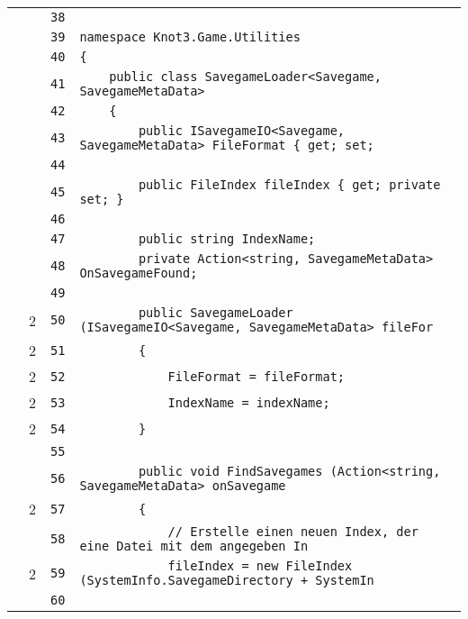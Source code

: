 \documentclass[a4paper,10pt]{article}
\begin{document}
\begin{longtable}[l]{lrrl}
\cellcolor{gray} &  & \verb~38~ & \verb~~\\
\cellcolor{gray} &  & \verb~39~ & \verb~namespace Knot3.Game.Utilities~\\
\cellcolor{gray} &  & \verb~40~ & \verb~{~\\
\cellcolor{gray} &  & \verb~41~ & \verb~    public class SavegameLoader<Savegame, SavegameMetaData>~\\
\cellcolor{gray} &  & \verb~42~ & \verb~    {~\\
\cellcolor{gray} &  & \verb~43~ & \verb~        public ISavegameIO<Savegame, SavegameMetaData> FileFormat { get; set; ~\\
\cellcolor{gray} &  & \verb~44~ & \verb~~\\
\cellcolor{gray} &  & \verb~45~ & \verb~        public FileIndex fileIndex { get; private set; }~\\
\cellcolor{gray} &  & \verb~46~ & \verb~~\\
\cellcolor{gray} &  & \verb~47~ & \verb~        public string IndexName;~\\
\cellcolor{gray} &  & \verb~48~ & \verb~        private Action<string, SavegameMetaData> OnSavegameFound;~\\
\cellcolor{gray} &  & \verb~49~ & \verb~~\\
\cellcolor{green} & 2 & \verb~50~ & \verb~        public SavegameLoader (ISavegameIO<Savegame, SavegameMetaData> fileFor~\\
\cellcolor{green} & 2 & \verb~51~ & \verb~        {~\\
\cellcolor{green} & 2 & \verb~52~ & \verb~            FileFormat = fileFormat;~\\
\cellcolor{green} & 2 & \verb~53~ & \verb~            IndexName = indexName;~\\
\cellcolor{green} & 2 & \verb~54~ & \verb~        }~\\
\cellcolor{gray} &  & \verb~55~ & \verb~~\\
\cellcolor{gray} &  & \verb~56~ & \verb~        public void FindSavegames (Action<string, SavegameMetaData> onSavegame~\\
\cellcolor{green} & 2 & \verb~57~ & \verb~        {~\\
\cellcolor{gray} &  & \verb~58~ & \verb~            // Erstelle einen neuen Index, der eine Datei mit dem angegeben In~\\
\cellcolor{green} & 2 & \verb~59~ & \verb~            fileIndex = new FileIndex (SystemInfo.SavegameDirectory + SystemIn~\\
\cellcolor{gray} &  & \verb~60~ & \verb~~\\

\end{longtable}
\end{document}
